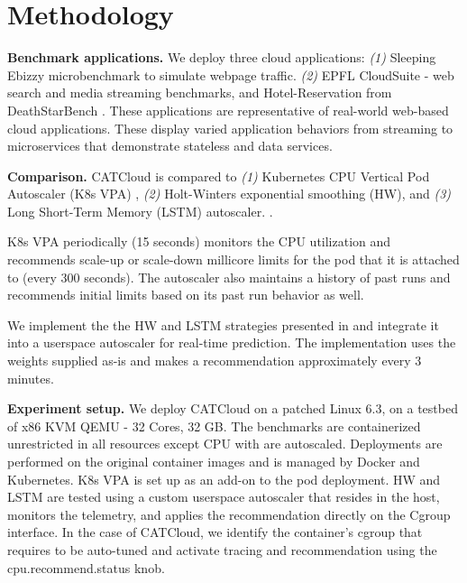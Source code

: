 \section{Methodology}

\textbf{Benchmark applications.} We deploy three cloud applications: \textit{(1)} Sleeping Ebizzy microbenchmark \cite{bhat_pratiksampatsleeping-ebizzy_2014} to simulate webpage traffic. \textit{(2)} EPFL CloudSuite \cite{ferdman_clearing_2012} - web search and media streaming benchmarks, and Hotel-Reservation from DeathStarBench \cite{gan_open-source_2019}. These applications are representative of real-world web-based cloud applications. These display varied application behaviors from streaming to microservices that demonstrate stateless and data services.

\textbf{Comparison.} CATCloud is compared to \textit{(1)} Kubernetes CPU Vertical Pod Autoscaler (K8s VPA) \cite{noauthor_kubernetes_nodate}, \textit{(2)} Holt-Winters exponential smoothing (HW), and \textit{(3)} Long Short-Term Memory (LSTM) autoscaler. \cite{wang_predicting_2021}.

K8s VPA periodically (15 seconds) monitors the CPU utilization and recommends scale-up or scale-down millicore limits for the pod that it is attached to (every 300 seconds). The autoscaler also maintains a history of past runs and recommends initial limits based on its past run behavior as well.

We implement the the HW and LSTM strategies presented in \cite{wang_predicting_2021} and integrate it into a userspace autoscaler for real-time prediction. The implementation uses the weights supplied as-is and makes a recommendation approximately every 3 minutes.



\textbf{Experiment setup.} We deploy CATCloud on a patched Linux 6.3, on a testbed of x86 KVM QEMU - 32 Cores, 32 GB. The benchmarks are containerized unrestricted in all resources except CPU with are autoscaled. Deployments are performed on the original container images and is managed by Docker and Kubernetes. K8s VPA is set up as an add-on to the pod deployment. HW and LSTM are tested using a custom userspace autoscaler that resides in the host, monitors the telemetry, and applies the recommendation directly on the Cgroup interface. In the case of CATCloud, we identify the container's cgroup that requires to be auto-tuned and activate tracing and recommendation using the cpu.recommend.status knob.

